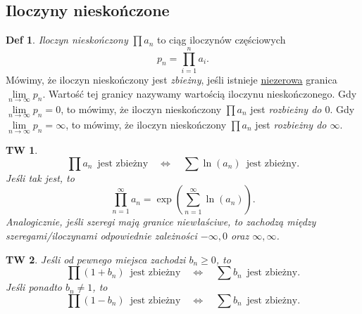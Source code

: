 \documentclass[a4paper, 12pt]{mwart}
\theoremstyle{definition}
\newtheorem{definicja}{Def}[section]
\theoremstyle{plain}
\newtheorem{twierdzenie}{TW}[section]
\theoremstyle{remark}
\begin{document}
\subsection{Iloczyny nieskończone}
\begin{definicja}
	\emph{Iloczyn nieskończony} $\prod a_n$ to ciąg iloczynów częściowych
	\begin{equation}
		p_n = \prod_{i=1}^{n} a_i.
	\end{equation}
	Mówimy, że iloczyn nieskończony jest \emph{zbieżny}, jeśli istnieje \underline{niezerowa} granica $\lim\limits_{n \to\infty}p_n$. Wartość tej granicy nazywamy wartością iloczynu nieskończonego.
	Gdy $\lim\limits_{n \to\infty}p_n = 0$, to mówimy, że iloczyn nieskończony $\prod a_n$ jest \emph{rozbieżny do $0$}.
	Gdy  $\lim\limits_{n \to\infty}p_n = \infty$, to mówimy, że iloczyn nieskończony $\prod a_n$ jest \emph{rozbieżny do $\infty$}.
\end{definicja}
\begin{twierdzenie}
	\begin{equation}
		\prod a_n \,\,\,\text{jest zbieżny}\quad \iff \quad\sum \ln(a_n) \,\,\,\text{jest zbieżny}.
	\end{equation}
	Jeśli tak jest, to
	\begin{equation}
		\prod_{n=1}^{\infty} a_n = \exp\left({\sum_{n=1}^{\infty} \ln(a_n)}\right).
	\end{equation}
	Analogicznie, jeśli szeregi mają granice niewłaściwe, to zachodzą między szeregami/iloczynami odpowiednie zależności $-\infty, 0$ oraz $\infty, \infty$.
\end{twierdzenie}
\begin{twierdzenie}
	Jeśli od pewnego miejsca zachodzi $b_n \geq 0$, to
	\begin{equation}
		\prod (1+b_n) \,\,\,\text{jest zbieżny} \quad \iff \quad \sum b_n \,\,\,\text{jest zbieżny}.
	\end{equation}
	Jeśli ponadto $b_n \neq 1$, to
	\begin{equation}
		\prod (1-b_n) \,\,\,\text{jest zbieżny} \quad \iff \quad \sum b_n \,\,\,\text{jest zbieżny}.
	\end{equation}
\end{twierdzenie}









\end{document}
